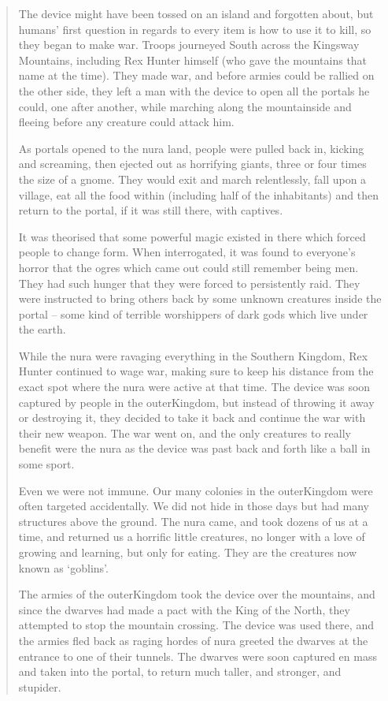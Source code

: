 \begin{multicols}{2}
\begin{quotation}
	The device might have been tossed on an island and forgotten about, but humans' first question in regards to every item is how to use it to kill, so they began to make war.
	Troops journeyed South across the Kingsway Mountains, including Rex Hunter himself (who gave the mountains that name at the time).
	They made war, and before armies could be rallied on the other side, they left a man with the device to open all the portals he could, one after another, while marching along the mountainside and fleeing before any creature could attack him.

	As portals opened to the nura land, people were pulled back in, kicking and screaming, then ejected out as horrifying giants, three or four times the size of a gnome.
	They would exit and march relentlessly, fall upon a village, eat all the food within (including half of the inhabitants) and then return to the portal, if it was still there, with captives.

	It was theorised that some powerful magic existed in there which forced people to change form.
	When interrogated, it was found to everyone's horror that the ogres which came out could still remember being men.
	They had such hunger that they were forced to persistently raid.
	They were instructed to bring others back by some unknown creatures inside the portal -- some kind of terrible worshippers of dark gods which live under the earth.

	While the nura were ravaging everything in the Southern Kingdom, Rex Hunter continued to wage war, making sure to keep his distance from the exact spot where the nura were active at that time.
	The device was soon captured by people in the \gls{outerKingdom}, but instead of throwing it away or destroying it, they decided to take it back and continue the war with their new weapon.
	The war went on, and the only creatures to really benefit were the nura as the device was past back and forth like a ball in some sport.

	Even we were not immune.
	Our many colonies in the \gls{outerKingdom} were often targeted accidentally.
	We did not hide in those days but had many structures above the ground.
	The nura came, and took dozens of us at a time, and returned us a horrific little creatures, no longer with a love of growing and learning, but only for eating.
	They are the creatures now known as `goblins'.

	The armies of the \gls{outerKingdom} took the device over the mountains, and since the dwarves had made a pact with the King of the North, they attempted to stop the mountain crossing.
	The device was used there, and the armies fled back as raging hordes of nura greeted the dwarves at the entrance to one of their tunnels.
	The dwarves were soon captured en mass and taken into the portal, to return much taller, and stronger, and stupider.


\end{quotation}
\end{multicols}
